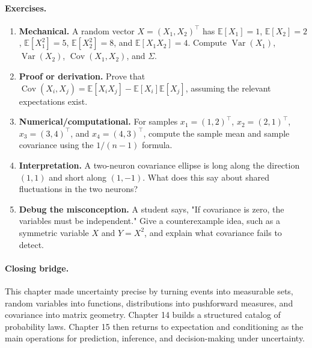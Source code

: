 \paragraph{Exercises.}
\begin{enumerate}[label=\textbf{13.4.\arabic*.}, leftmargin=*]
\item \textbf{Mechanical.} A random vector \(X=(X_1,X_2)^\top\) has \(\mathbb{E}[X_1]=1\), \(\mathbb{E}[X_2]=2\), \(\mathbb{E}[X_1^2]=5\), \(\mathbb{E}[X_2^2]=8\), and \(\mathbb{E}[X_1X_2]=4\). Compute \(\operatorname{Var}(X_1)\), \(\operatorname{Var}(X_2)\), \(\operatorname{Cov}(X_1,X_2)\), and \(\Sigma\).
\item \textbf{Proof or derivation.} Prove that \(\operatorname{Cov}(X_i,X_j)=\mathbb{E}[X_iX_j]-\mathbb{E}[X_i]\mathbb{E}[X_j]\), assuming the relevant expectations exist.
\item \textbf{Numerical/computational.} For samples \(x_1=(1,2)^\top\), \(x_2=(2,1)^\top\), \(x_3=(3,4)^\top\), and \(x_4=(4,3)^\top\), compute the sample mean and sample covariance using the \(1/(n-1)\) formula.
\item \textbf{Interpretation.} A two-neuron covariance ellipse is long along the direction \((1,1)\) and short along \((1,-1)\). What does this say about shared fluctuations in the two neurons?
\item \textbf{Debug the misconception.} A student says, "If covariance is zero, the variables must be independent." Give a counterexample idea, such as a symmetric variable \(X\) and \(Y=X^2\), and explain what covariance fails to detect.
\end{enumerate}

\paragraph{Closing bridge.}
This chapter made uncertainty precise by turning events into measurable sets, random variables into functions, distributions into pushforward measures, and covariance into matrix geometry. Chapter 14 builds a structured catalog of probability laws. Chapter 15 then returns to expectation and conditioning as the main operations for prediction, inference, and decision-making under uncertainty.

\clearpage
